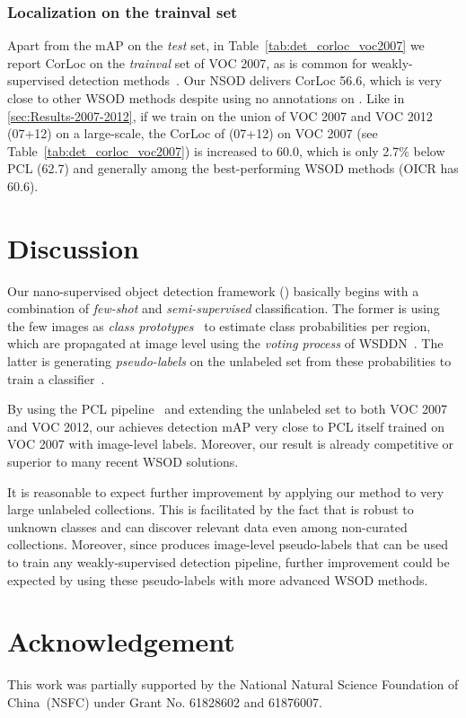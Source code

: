 \documentclass[review]{elsarticle}
\begin{document}
\subsubsection{Localization on the trainval set}
Apart from the mAP on the \emph{test} set, in Table~\ref{tab:det_corloc_voc2007} we report CorLoc on the \emph{trainval} set of VOC 2007, as is common for weakly-supervised detection methods~\cite{wsddn,tang2017cvpr,tang2018eccv,tang2018pami,shen2019cvpr}. Our NSOD delivers CorLoc 56.6, which is very close to other WSOD methods despite using no annotations on .  Like in \autoref{sec:Results-2007-2012}, if we train \ours on the union of VOC 2007 and VOC 2012 (07+12) on a large-scale, the CorLoc of \ours(07+12) on VOC 2007 (see Table~\ref{tab:det_corloc_voc2007}) is increased to 60.0, which is only 2.7\% below PCL (62.7) and generally among the best-performing WSOD methods (\eg OICR has 60.6). 





 \section{Discussion}
\label{sec:discussion}





Our nano-supervised object detection framework (\ours) basically begins with a combination of \emph{few-shot} and \emph{semi-supervised} classification. The former is using the few images as \emph{class prototypes}~\cite{snell2017} to estimate class probabilities per region, which are propagated at image level using the \emph{voting process} of WSDDN~\cite{wsddn}. The latter is generating \emph{pseudo-labels} on the unlabeled set from these probabilities to train a classifier~\cite{Lee13}.

By using the PCL pipeline~\cite{tang2018pami} and extending the unlabeled set to both VOC 2007 and VOC 2012, our \ours achieves detection mAP very close to PCL itself trained on VOC 2007 with image-level labels. Moreover, our result is already competitive or superior to many recent WSOD solutions.

It is reasonable to expect further improvement by applying our method to very large unlabeled collections. This is facilitated by the fact that \ours is robust to unknown classes and can discover relevant data even among non-curated collections. Moreover, since \ours produces image-level pseudo-labels that can be used to train any weakly-supervised detection pipeline, further improvement could be expected by using these pseudo-labels with more advanced WSOD methods. 




%
 
\section*{Acknowledgement}

This work was partially supported by the National Natural Science Foundation of China~(NSFC) under Grant No. 61828602 and 61876007. 

\end{document}
